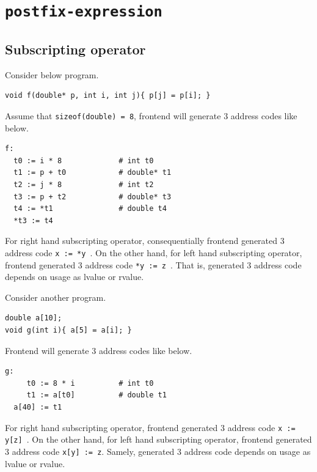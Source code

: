 \section{\tt{postfix-expression}}

\subsection{Subscripting operator}
\label{expr_e017}

Consider below program.
\begin{verbatim}
void f(double* p, int i, int j){ p[j] = p[i]; }
\end{verbatim}
Assume that {\tt{sizeof(double) = 8}},
frontend will generate 3 address codes like below.
\begin{verbatim}
f:
  t0 := i * 8             # int t0
  t1 := p + t0            # double* t1
  t2 := j * 8             # int t2
  t3 := p + t2            # double* t3
  t4 := *t1               # double t4
  *t3 := t4
\end{verbatim}
For right hand subscripting operator, 
consequentially frontend generated 3 address code {\tt{x := *y }}.
On the other hand, for left hand subscripting operator,
frontend generated 3 address code {\tt{*y := z }}.
That is, generated 3 address code depends on usage as lvalue or rvalue.

Consider another program.
\begin{verbatim}
double a[10];
void g(int i){ a[5] = a[i]; }
\end{verbatim}
Frontend will generate 3 address codes like below.
\begin{verbatim}
g:
     t0 := 8 * i          # int t0
     t1 := a[t0]          # double t1
  a[40] := t1
\end{verbatim}
For right hand subscripting operator, 
frontend generated 3 address code {\tt{x := y[z] }}.
On the other hand, for left hand subscripting operator,
frontend generated 3 address code {\tt{x[y] := z}}.
Samely, generated 3 address code depends on usage as lvalue or rvalue.

